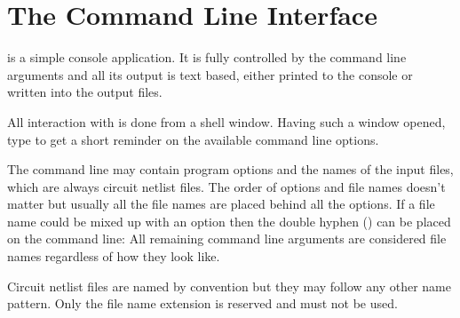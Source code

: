 \chapter{The Command Line Interface}

\linnet{} is a simple console application. It is fully controlled by the
command line arguments and all its output is text based, either printed
to the console or written into the output files.

All interaction with \linnet{} is done from a shell window. Having such a
window opened, type  to get a short reminder on the
available command line options.

The command line may contain program options and the names of the input
files, which are always circuit netlist files. The order of options and
file names doesn't matter but usually all the file names are placed behind
all the options. If a file name could be mixed up with an option then the
double hyphen (\code{--}) can be placed on the command line: All remaining
command line arguments are considered file names regardless of how they
look like.

Circuit netlist files are named  by convention but they may
follow any other name pattern. Only the file name extension 
is reserved and must not be used.


